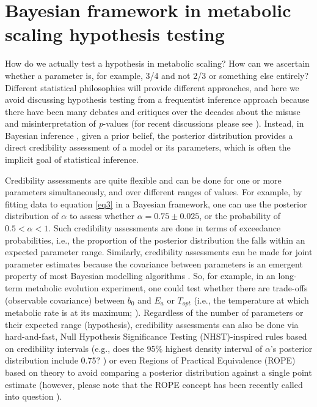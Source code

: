 \documentclass[a4paper,12pt]{article}
\begin{document}
\bigskip
\bigskip

\section{Bayesian framework in metabolic scaling hypothesis testing}
\label{bayesian}

How do we actually test a hypothesis in metabolic scaling? How can we ascertain whether a parameter is, for example, 3/4 and not 2/3 or something else entirely? Different statistical philosophies will provide different approaches, and here we avoid discussing hypothesis testing from a frequentist inference approach because there have been many debates and critiques over the decades about the misuse and misinterpretation of \emph{p}-values (for recent discussions please see \cite{wasserstein2016amstat, benjamin2017nathumbeh, amrhein2019nat, muff2022tree, lakens2022tree, muff2022responsetree}). Instead, in Bayesian inference \cite{kruschke2010tree}, given a prior belief, the posterior distribution provides a direct credibility assessment of a model or its parameters, which is often the implicit goal of statistical inference.

Credibility assessments are quite flexible and can be done for one or more parameters simultaneously, and over different ranges of values. For example, by fitting data to equation \ref{eq3} in a Bayesian framework, one can use the posterior distribution of $\alpha$ to assess whether $\alpha = 0.75 \pm 0.025$, or the probability of $0.5 < \alpha < 1$. Such credibility assessments are done in terms of exceedance probabilities, i.e., the proportion of the posterior distribution the falls within an expected parameter range. Similarly, credibility assessments can be made for joint parameter estimates because the covariance between parameters is an emergent property of most Bayesian modelling algorithms \cite{kruschke2010tree}. So, for example, in an long-term metabolic evolution experiment, one could test whether there are trade-offs (observable covariance) between $b_0$ and $E_a$ or $T_{opt}$ (i.e., the temperature at which metabolic rate is at its maximum; \cite{schoolfield1981, pawar2015amnat, barton2020ele}). Regardless of the number of parameters or their expected range (hypothesis), credibility assessments can also be done via hard-and-fast, Null Hypothesis Significance Testing (NHST)-inspired rules based on credibility intervals (e.g., does the 95\% highest density interval of $\alpha$'s posterior distribution include 0.75? \cite{barneche2014ele, barneche2018ele}) or even Regions of Practical Equivalence (ROPE) based on theory \cite{kruscke2018psybullrev, nunes2021functecol} to avoid comparing a posterior distribution against a single point estimate (however, please note that the ROPE concept has been recently called into question \cite{schwaferts2020report}).
\end{document}
